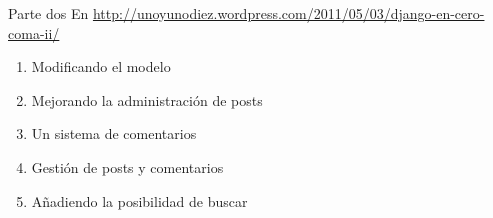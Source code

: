 \documentclass[spanish]{beamer}
\begin{document}
\begin{frame}{Parte dos}
En \url{http://unoyunodiez.wordpress.com/2011/05/03/django-en-cero-coma-ii/}
\begin{enumerate}
\item Modificando el modelo 
\item Mejorando la administración de posts
\item Un sistema de comentarios
\item Gestión de posts y comentarios
\item Añadiendo la posibilidad de buscar
\end{enumerate}
\end{frame}
\end{document}
